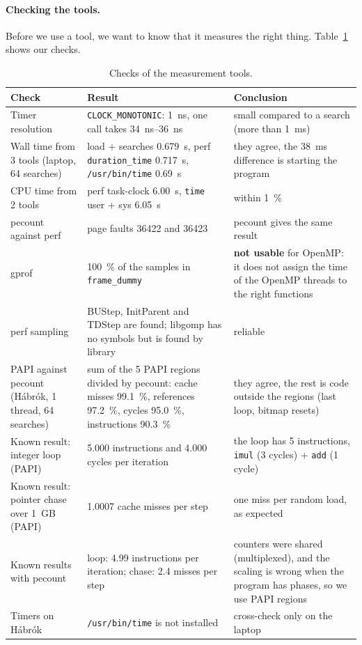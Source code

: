 \paragraph{Checking the tools.} Before we use a tool, we want to know that it measures the
right thing. Table~\ref{tab:validation} shows our checks.
\begin{table}[ht]
\centering\small
\caption{Checks of the measurement tools.}
\label{tab:validation}
\begin{tabular}{@{}p{3.4cm}p{6.1cm}p{4.6cm}@{}}
\toprule
Check & Result & Conclusion \\
\midrule
Timer resolution & \texttt{CLOCK\_MONOTONIC}: \SI{1}{ns}, one call takes \SIrange{34}{36}{ns} & small compared to a search (more than \SI{1}{ms}) \\
Wall time from 3 tools (laptop, 64 searches) & \gapbs{} load + searches \SI{0.679}{s}, perf \texttt{duration\_time} \SI{0.717}{s}, \texttt{/usr/bin/time} \SI{0.69}{s} & they agree, the \SI{38}{ms} difference is starting the program \\
CPU time from 2 tools & perf task-clock \SI{6.00}{s}, \texttt{time} user + sys \SI{6.05}{s} & within \SI{1}{\percent} \\
pecount against perf & page faults \num{36422} and \num{36423} & pecount gives the same result \\
gprof & \SI{100}{\percent} of the samples in \texttt{frame\_dummy} & \textbf{not usable} for OpenMP: it does not assign the time of the OpenMP threads to the right functions \\
perf sampling & BUStep, InitParent and TDStep are found; libgomp has no symbols but is found by library & reliable \\
PAPI against pecount (Hábrók, 1 thread, 64 searches) & sum of the 5 PAPI regions divided by pecount: cache misses \SI{99.1}{\percent}, references \SI{97.2}{\percent}, cycles \SI{95.0}{\percent}, instructions \SI{90.3}{\percent} & they agree, the rest is code outside the regions (last loop, bitmap resets) \\
Known result: integer loop (PAPI) & \num{5.000} instructions and \num{4.000} cycles per iteration & the loop has 5 instructions, \texttt{imul} (3 cycles) + \texttt{add} (1 cycle) \\
Known result: pointer chase over \SI{1}{GB} (PAPI) & \num{1.0007} cache misses per step & one miss per random load, as expected \\
Known results with pecount & loop: \num{4.99} instructions per iteration; chase: \num{2.4} misses per step & counters were shared (multiplexed), and the scaling is wrong when the program has phases, so we use PAPI regions \\
Timers on Hábrók & \texttt{/usr/bin/time} is not installed & cross-check only on the laptop \\
\bottomrule
\end{tabular}
\end{table}

